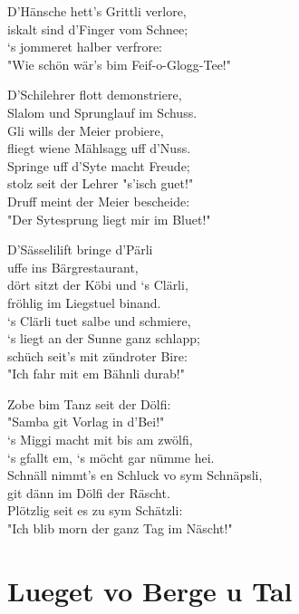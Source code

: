 \documentclass[
  letterpaper,
  twoside=false]{scrbook}
\begin{document}
D'Hänsche hett's Grittli verlore,\\
iskalt sind d'Finger vom Schnee;\\
`s jommeret halber verfrore:\\
"Wie schön wär's bim Feif-o-Glogg-Tee!"

D'Schilehrer flott demonstriere,\\
Slalom und Sprunglauf im Schuss.\\
Gli wills der Meier probiere,\\
fliegt wiene Mählsagg uff d'Nuss.\\
Springe uff d'Syte macht Freude;\\
stolz seit der Lehrer "s'isch guet!"\\
Druff meint der Meier bescheide:\\
"Der Sytesprung liegt mir im Bluet!"

D'Sässelilift bringe d'Pärli\\
uffe ins Bärgrestaurant,\\
dört sitzt der Köbi und `s Clärli,\\
fröhlig im Liegstuel binand.\\
`s Clärli tuet salbe und schmiere,\\
`s liegt an der Sunne ganz schlapp;\\
schüch seit's mit zündroter Bire:\\
"Ich fahr mit em Bähnli durab!"

Zobe bim Tanz seit der Dölfi:\\
"Samba git Vorlag in d'Bei!"\\
`s Miggi macht mit bis am zwölfi,\\
`s gfallt em, `s möcht gar nümme hei.\\
Schnäll nimmt's en Schluck vo sym Schnäpsli,\\
git dänn im Dölfi der Räscht.\\
Plötzlig seit es zu sym Schätzli:\\
"Ich blib morn der ganz Tag im Näscht!"

\hypertarget{lueget-vo-berge-u-tal}{%
\chapter{Lueget vo Berge u Tal}\label{lueget-vo-berge-u-tal}}
\end{document}
